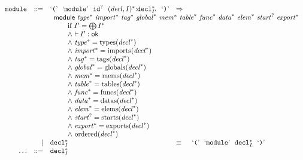 $$
\begin{array}[t]{@{}lrrl@{}l@{}l@{}l@{}}
& {\mathtt{module}} & ::= & \mbox{‘\texttt{{(}}’}~~\mbox{‘\texttt{module}’}~~{{\mathtt{id}}^?}~~{({\mathit{decl}}, I)^\ast}{:}{{{\mathtt{decl}}}_{{I'}}^\ast}~~\mbox{‘\texttt{{)}}’} & \quad\Rightarrow\quad{} & & \\
&&& \multicolumn{4}{@{}l@{}}{\quad
\begin{array}[t]{@{}l@{}l@{}l@{}}
\mathsf{module}~{{\mathit{type}}^\ast}~{{\mathit{import}}^\ast}~{{\mathit{tag}}^\ast}~{{\mathit{global}}^\ast}~{{\mathit{mem}}^\ast}~{{\mathit{table}}^\ast}~{{\mathit{func}}^\ast}~{{\mathit{data}}^\ast}~{{\mathit{elem}}^\ast}~{{\mathit{start}}^?}~{{\mathit{export}}^\ast} & & \\
 \multicolumn{3}{@{}l@{}}{\quad
\begin{array}[t]{@{}l@{}}
\quad
\begin{array}[t]{@{}l@{}}
\mbox{if}~ {I'} = {\bigoplus}\, {I^\ast} \\
{\land}~ {\vdash}\, {I'} : \mathsf{ok} \\
{\land}~ {{\mathit{type}}^\ast} = {\mathrm{types}}({{\mathit{decl}}^\ast}) \\
{\land}~ {{\mathit{import}}^\ast} = {\mathrm{imports}}({{\mathit{decl}}^\ast}) \\
{\land}~ {{\mathit{tag}}^\ast} = {\mathrm{tags}}({{\mathit{decl}}^\ast}) \\
{\land}~ {{\mathit{global}}^\ast} = {\mathrm{globals}}({{\mathit{decl}}^\ast}) \\
{\land}~ {{\mathit{mem}}^\ast} = {\mathrm{mems}}({{\mathit{decl}}^\ast}) \\
{\land}~ {{\mathit{table}}^\ast} = {\mathrm{tables}}({{\mathit{decl}}^\ast}) \\
{\land}~ {{\mathit{func}}^\ast} = {\mathrm{funcs}}({{\mathit{decl}}^\ast}) \\
{\land}~ {{\mathit{data}}^\ast} = {\mathrm{datas}}({{\mathit{decl}}^\ast}) \\
{\land}~ {{\mathit{elem}}^\ast} = {\mathrm{elems}}({{\mathit{decl}}^\ast}) \\
{\land}~ {{\mathit{start}}^?} = {\mathrm{starts}}({{\mathit{decl}}^\ast}) \\
{\land}~ {{\mathit{export}}^\ast} = {\mathrm{exports}}({{\mathit{decl}}^\ast}) \\
{\land}~ {\mathrm{ordered}}({{\mathit{decl}}^\ast}) \\
\end{array} \\
\end{array}
} \\
\end{array}
} \\
& & | & {{{\mathtt{decl}}}_{I}^\ast} & \quad\equiv\quad{} & \mbox{‘\texttt{{(}}’}~~\mbox{‘\texttt{module}’}~~{{{\mathtt{decl}}}_{I}^\ast}~~\mbox{‘\texttt{{)}}’} \\
& \ldots & ::= & {{{\mathtt{decl}}}_{I}^\ast} \\
\end{array}
$$

